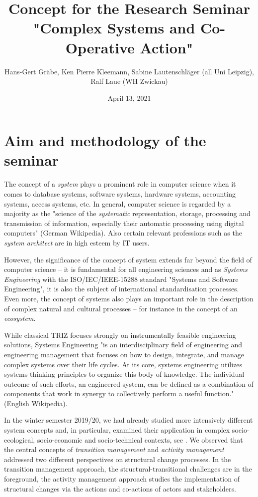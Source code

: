 \documentclass[11pt,a4paper]{article}
\title{Concept for the Research Seminar\\ "Complex Systems and Co-Operative
  Action"}
\author{Hans-Gert Gr\"abe, Ken Pierre Kleemann, Sabine Lautenschläger (all
  Uni Leipzig),\\ Ralf Laue (WH Zwickau) }
\date{April 13, 2021}
\begin{document}
\maketitle

\section{Aim and methodology of the seminar}

The concept of a \emph{system} plays a prominent role in computer science when
it comes to database systems, software systems, hardware systems, accounting
systems, access systems, etc.  In general, computer science is regarded by a
majority as the "science of the \emph{systematic} representation, storage,
processing and transmission of information, especially their automatic
processing using digital computers" (German Wikipedia).  Also certain relevant
professions such as the \emph{system architect} are in high esteem by IT
users.

However, the significance of the concept of system extends far beyond the
field of computer science -- it is fundamental for all engineering sciences
and as \emph{Systems Engineering} with the ISO/IEC/IEEE-15288 standard
"Systems and Software Engineering", it is also the subject of international
standardisation processes.  Even more, the concept of systems also plays an
important role in the description of complex natural and cultural processes --
for instance in the concept of an \emph{ecosystem}.

While classical TRIZ focuses strongly on instrumentally feasible engineering
solutions, Systems Engineering "is an interdisciplinary field of engineering
and engineering management that focuses on how to design, integrate, and
manage complex systems over their life cycles. At its core, systems
engineering utilizes systems thinking principles to organize this body of
knowledge. The individual outcome of such efforts, an engineered system, can
be defined as a combination of components that work in synergy to collectively
perform a useful function." (English Wikipedia). 

In the winter semester 2019/20, we had already studied more intensively
different system concepts and, in particular, examined their application in
complex socio-ecological, socio-economic and socio-technical contexts, see
\cite{Graebe2020}. We observed that the central concepts of \emph{transition
  management} and \emph{activity management} addressed two different
perspectives on structural change processes. In the transition management
approach, the structural-transitional challenges are in the foreground, the
activity management approach studies the implementation of structural changes
via the actions and co-actions of actors and stakeholders.
\end{document}
